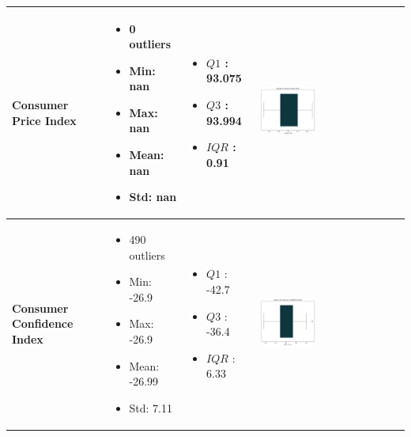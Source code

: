 \documentclass{article}
\begin{document}
\begin{longtable}{|p{}|p{}|p{}|p{}|}
            \hline
            \textbf{Consumer Price Index} & 
            \begin{itemize}
                \item 0 outliers
                \item Min: nan
                \item Max: nan
                \item Mean: nan
                \item Std: nan
            \end{itemize} & 
            \begin{itemize}
                \item $Q1$ : 93.075
                \item $Q3$ : 93.994
                \item $IQR$ : 0.91
            \end{itemize} &
            \includegraphics[width=0.40\textwidth]{data/bank_marketing/pic/Outlier/price.png} \\
            \hline
            \textbf{Consumer Confidence Index} & 
            \begin{itemize}
                \item 490 outliers
                \item Min: -26.9
                \item Max: -26.9
                \item Mean: -26.99
                \item Std: 7.11
            \end{itemize} & 
            \begin{itemize}
                \item $Q1$ : -42.7
                \item $Q3$ : -36.4
                \item $IQR$ : 6.33
            \end{itemize} &
            \includegraphics[width=0.40\textwidth]{data/bank_marketing/pic/Outlier/conf.png} \\

\end{longtable}
\end{document}
